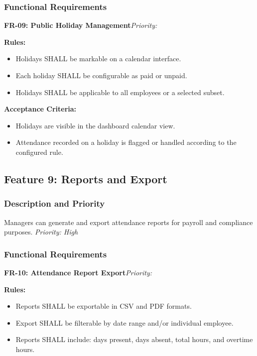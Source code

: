 \documentclass[12pt, a4paper]{article}
\newcommand{\frblock}[2]{%
    \noindent\textbf{#1}\hfill\textit{Priority: #2}%
    \par\smallskip%
}
\newcommand{\srsfield}[1]{\noindent\textbf{#1:}\par}
\begin{document}
\subsubsection*{Functional Requirements}

\frblock{FR-09: Public Holiday Management}{}

\srsfield{Rules}
\begin{itemize}
    \item Holidays SHALL be markable on a calendar interface.
    \item Each holiday SHALL be configurable as paid or unpaid.
    \item Holidays SHALL be applicable to all employees or a selected
          subset.
\end{itemize}

\srsfield{Acceptance Criteria}
\begin{itemize}
    \item Holidays are visible in the dashboard calendar view.
    \item Attendance recorded on a holiday is flagged or handled
          according to the configured rule.
\end{itemize}

\subsection{Feature 9: Reports and Export}

\subsubsection*{Description and Priority}
Managers can generate and export attendance reports for payroll and
compliance purposes.
\hfill \textit{Priority: High}

\subsubsection*{Functional Requirements}

\frblock{FR-10: Attendance Report Export}{}

\srsfield{Rules}
\begin{itemize}
    \item Reports SHALL be exportable in CSV and PDF formats.
    \item Export SHALL be filterable by date range and/or individual
          employee.
    \item Reports SHALL include: days present, days absent, total hours,
          and overtime hours.
\end{itemize}
\end{document}

